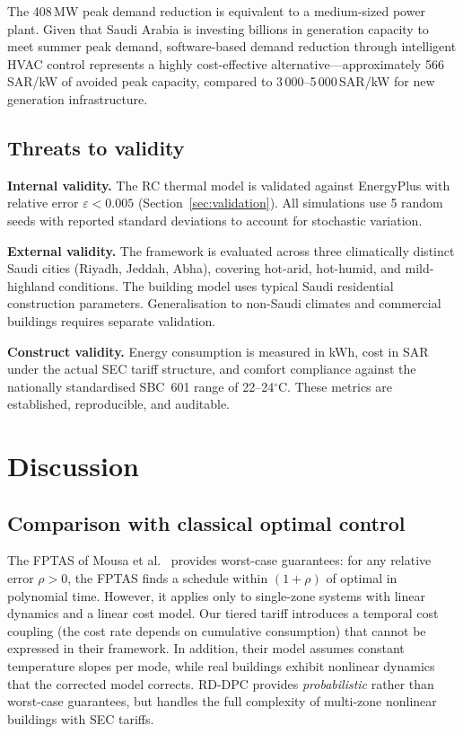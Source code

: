 \documentclass[12pt]{article}
\theoremstyle{plain}
\theoremstyle{definition}
\begin{document}
The 408\,MW peak demand reduction is equivalent to a medium-sized power plant. Given that Saudi Arabia is investing billions in generation capacity to meet summer peak demand, software-based demand reduction through intelligent HVAC control represents a highly cost-effective alternative---approximately 566\,SAR/kW of avoided peak capacity, compared to 3\,000--5\,000\,SAR/kW for new generation infrastructure.

\subsection{Threats to validity}

\textbf{Internal validity.} The RC thermal model is validated against EnergyPlus with relative error $\varepsilon < 0.005$ (Section~\ref{sec:validation}). All simulations use 5 random seeds with reported standard deviations to account for stochastic variation.

\textbf{External validity.} The framework is evaluated across three climatically distinct Saudi cities (Riyadh, Jeddah, Abha), covering hot-arid, hot-humid, and mild-highland conditions. The building model uses typical Saudi residential construction parameters. Generalisation to non-Saudi climates and commercial buildings requires separate validation.

\textbf{Construct validity.} Energy consumption is measured in kWh, cost in SAR under the actual SEC tariff structure, and comfort compliance against the nationally standardised SBC~601 range of 22--24$^\circ$C. These metrics are established, reproducible, and auditable.

\section{Discussion}\label{sec:discussion}

\subsection{Comparison with classical optimal control}

The FPTAS of Mousa et al.~\cite{mousa2018optimal} provides worst-case guarantees: for any relative error $\rho > 0$, the FPTAS finds a schedule within $(1+\rho)$ of optimal in polynomial time. However, it applies only to single-zone systems with linear dynamics and a linear cost model. Our tiered tariff introduces a temporal cost coupling (the cost rate depends on cumulative consumption) that cannot be expressed in their framework. In addition, their model assumes constant temperature slopes per mode, while real buildings exhibit nonlinear dynamics that the corrected model corrects. RD-DPC provides \emph{probabilistic} rather than worst-case guarantees, but handles the full complexity of multi-zone nonlinear buildings with SEC tariffs.
\end{document}
